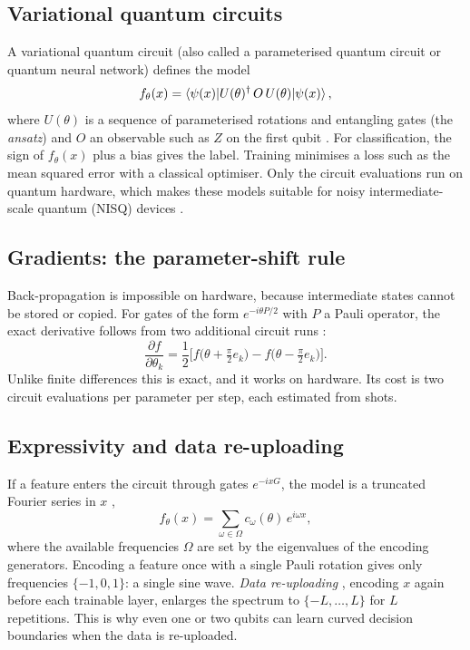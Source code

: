 \documentclass[11pt,a4paper]{article}
\begin{document}
\subsection{Variational quantum circuits}
A variational quantum circuit (also called a parameterised quantum circuit or quantum neural
network) defines the model
\begin{equation}
  f_\theta(x)=\braket{\psi(x)|U(\theta)^\dagger\,O\,U(\theta)|\psi(x)},
  \label{eq:vqc}
\end{equation}
where $U(\theta)$ is a sequence of parameterised rotations and entangling gates (the
\emph{ansatz}) and $O$ an observable such as $Z$ on the first qubit \citep{mitarai2018,cerezo2021vqa}.
For classification, the sign of $f_\theta(x)$ plus a bias gives the label. Training minimises a loss
such as the mean squared error with a classical optimiser. Only the circuit evaluations run on
quantum hardware, which makes these models suitable for noisy intermediate-scale quantum (NISQ)
devices \citep{preskill2018}.

\subsection{Gradients: the parameter-shift rule}
Back-propagation is impossible on hardware, because intermediate states cannot be stored or copied.
For gates of the form $e^{-i\theta P/2}$ with $P$ a Pauli operator, the exact derivative follows
from two additional circuit runs \citep{mitarai2018,schuld2019gradients}:
\begin{equation}
  \frac{\partial f}{\partial\theta_k}
  =\frac12\Big[f\big(\theta+\tfrac{\pi}{2}e_k\big)-f\big(\theta-\tfrac{\pi}{2}e_k\big)\Big].
\end{equation}
Unlike finite differences this is exact, and it works on hardware. Its cost is two circuit
evaluations per parameter per step, each estimated from shots.

\subsection{Expressivity and data re-uploading}
If a feature enters the circuit through gates $e^{-ixG}$, the model is a truncated Fourier series
in $x$ \citep{schuld2021fourier},
\begin{equation}
  f_\theta(x)=\sum_{\omega\in\Omega}c_\omega(\theta)\,e^{i\omega x},
\end{equation}
where the available frequencies $\Omega$ are set by the eigenvalues of the encoding generators.
Encoding a feature once with a single Pauli rotation gives only frequencies $\{-1,0,1\}$: a single
sine wave. \emph{Data re-uploading} \citep{perezsalinas2020}, encoding $x$ again before each trainable
layer, enlarges the spectrum to $\{-L,\dots,L\}$ for $L$ repetitions. This is why even one or two
qubits can learn curved decision boundaries when the data is re-uploaded.
\end{document}
